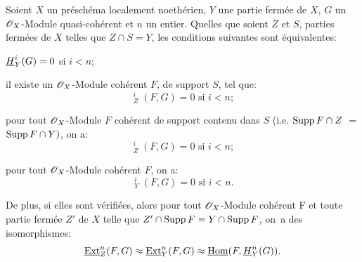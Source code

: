 \begin{proposition} \label{VII.1.2}
Soient $X$ un pr\'esch\'ema localement noeth\'erien, $Y$ une partie ferm\'ee de $X$, $G$ un $\mathscr{O}_X$-Module quasi-coh\'erent et $n$ un entier. Quelles que soient $Z$ et $S$, parties ferm\'ees de $X$ telles que $Z \cap S = Y$, les conditions suivantes sont \'equivalentes:
\begin{enumeratei}
\item
$\underline{H}^i_Y (G) = 0$ si $i<n$;

\item
il existe un $\mathscr{O}_X$-Module coh\'erent $F$, de support $S$, tel que:
\[
\mathop{\underline{\mathrm{Ext}}}\nolimits^i_Z (F, G) = 0 \text{ si } i<n;\]

\item
pour tout $\mathscr{O}_X$-Module $F$ coh\'erent de support contenu dans $S$ (i.e. $\operatorname{Supp} F \cap Z$ $=$ $\operatorname{Supp} F \cap Y)$, on a:
\[
\mathop{\underline{\mathrm{Ext}}}\nolimits^i_{Z}(F, G) = 0 \text{ si } i < n;
\]
\item
pour tout $\mathscr{O}_X$-Module coh\'erent $F$, on a:
\[
\mathop{\underline{\mathrm{Ext}}}\nolimits^i_Y (F, G) = 0 \text{ si } i < n.
\]
\end{enumeratei}
\noindent
De plus, si elles sont v\'erifi\'ees, alors pour tout $\mathscr{O}_X$-Module coh\'erent F et toute partie ferm\'ee $Z'$ de $X$ telle que $Z' \cap \operatorname{Supp} F = Y \cap \operatorname{Supp} F$, on~a des isomorphismes:
\[
\mathop{\underline{\mathrm{Ext}}}\nolimits^n_{Z} (F, G) \approx \mathop{\underline{\mathrm{Ext}}}\nolimits^n_Y (F, G) \approx \mathop{\underline{\mathrm{Hom}}}\nolimits (F, \underline{H}^n_Y (G)).
\]
\end{proposition}

